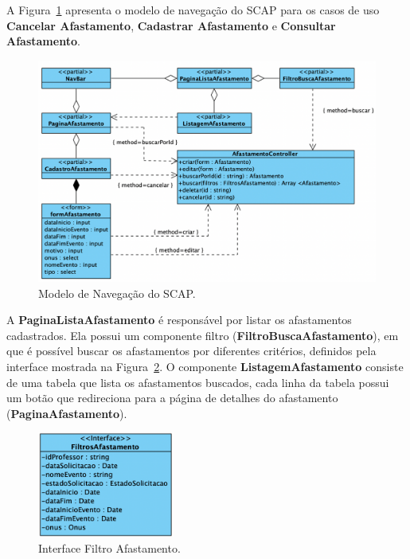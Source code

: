 A Figura~\ref{fig-modelo-navegacao-afast} apresenta o modelo de navegação do SCAP para os casos de uso
\textbf{Cancelar Afastamento}, \textbf{Cadastrar Afastamento} e \textbf{Consultar Afastamento}.

\begin{figure}
    \centering
    \includegraphics[width=1\textwidth]{figuras/fig-modelo-naveg-afast.png}
    \caption{Modelo de Navegação do SCAP.}
    \label{fig-modelo-navegacao-afast}
\end{figure}

A \textbf{PaginaListaAfastamento} é responsável por listar os afastamentos cadastrados.
Ela possui um componente filtro (\textbf{FiltroBuscaAfastamento}), em que é possível buscar
os afastamentos por diferentes critérios, definidos pela interface mostrada na Figura~\ref{fig-interface-filtro-afast}.
O componente \textbf{ListagemAfastamento} consiste de uma tabela que lista os afastamentos buscados,
cada linha da tabela possui um botão que redireciona para a página de detalhes do afastamento (\textbf{PaginaAfastamento}).

\begin{figure}
    \centering
    \includegraphics[width=0.4\textwidth]{figuras/fig-interface-filtro-afast.png}
    \caption{Interface Filtro Afastamento.}
    \label{fig-interface-filtro-afast}
\end{figure}

